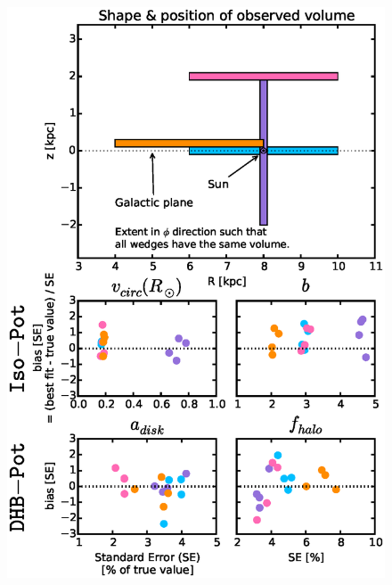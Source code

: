 \documentclass[iop,revtex4,numberedappendix,appendixfloats]{emulateapj}
\begin{document}
\begin{figure}[!htbp]
\centering
\includegraphics[width=\columnwidth]{figs/wedgesVol_bias_vs_SE.eps}

\end{figure}
\end{document}
